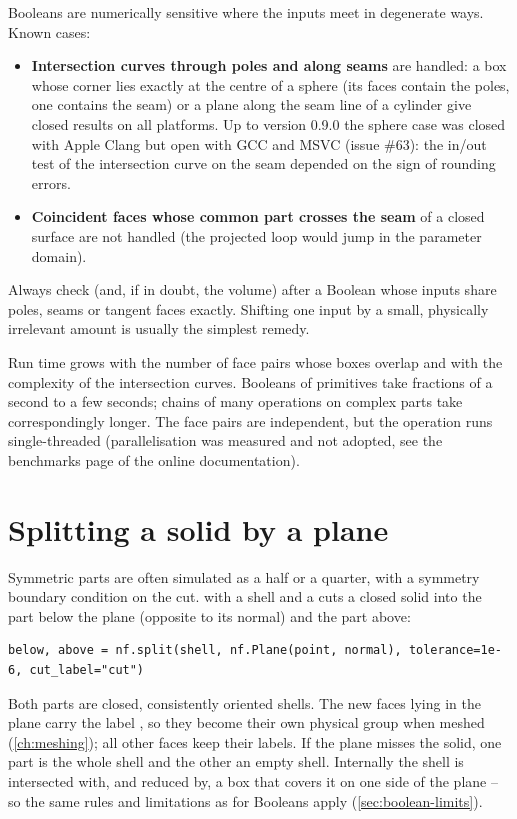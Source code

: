\begin{warning}
Booleans are numerically sensitive where the inputs meet in degenerate ways. Known cases:
\begin{itemize}
\item \textbf{Intersection curves through poles and along seams} are handled: a box whose
corner lies exactly at the centre of a sphere (its faces contain the poles, one contains the
seam) or a plane along the seam line of a cylinder give closed results on all platforms. Up to
version 0.9.0 the sphere case was closed with Apple Clang but open with GCC and MSVC (issue
\#63): the in/out test of the intersection curve on the seam depended on the sign of rounding
errors.
\item \textbf{Coincident faces whose common part crosses the seam} of a closed surface are
not handled (the projected loop would jump in the parameter domain).
\end{itemize}
Always check  (and, if in doubt, the volume) after a Boolean whose
inputs share poles, seams or tangent faces exactly. Shifting one input by a small, physically
irrelevant amount is usually the simplest remedy.
\end{warning}

Run time grows with the number of face pairs whose boxes overlap and with the complexity of
the intersection curves. Booleans of primitives take fractions of a second to a few seconds;
chains of many operations on complex parts take correspondingly longer. The face pairs are
independent, but the operation runs single-threaded (parallelisation was measured and not
adopted, see the benchmarks page of the online documentation).

\section{Splitting a solid by a plane}\label{sec:split-solid}

Symmetric parts are often simulated as a half or a quarter, with a symmetry boundary condition
on the cut.  with a shell and a  cuts a closed solid into the part
below the plane (opposite to its normal) and the part above:

\begin{lstlisting}
below, above = nf.split(shell, nf.Plane(point, normal), tolerance=1e-6, cut_label="cut")
\end{lstlisting}

Both parts are closed, consistently oriented shells. The new faces lying in the plane carry the
label , so they become their own physical group when meshed
(\cref{ch:meshing}); all other faces keep their labels. If the plane misses the solid, one part
is the whole shell and the other an empty shell. Internally the shell is intersected with, and
reduced by, a box that covers it on one side of the plane -- so the same rules and limitations
as for Booleans apply (\cref{sec:boolean-limits}).

